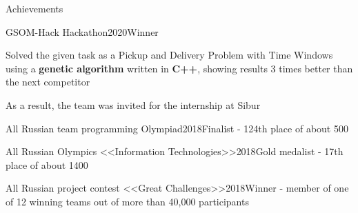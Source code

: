 \documentclass{./resume} %
\begin{document}

\begin{rSection}{Achievements}
    \begin{rSubsection}
        {GSOM-Hack Hackathon}{2020}{Winner}{}
        \item Solved the given task as a Pickup and Delivery Problem with Time Windows using a \textbf{genetic algorithm} written in \textbf{C++}, showing results 3 times better than the next competitor
        \item As a result, the team was invited for the internship at Sibur
    \end{rSubsection}
    \begin{rSubsubsection}
        {All Russian team programming Olympiad}{2018}{Finalist - 124th place of about 500}{}
    \end{rSubsubsection}
    \begin{rSubsubsection}
        {All Russian Olympics <<Information Technologies>>}{2018}{Gold medalist - 17th place of about 1400}{}
    \end{rSubsubsection}
    \begin{rSubsubsection}
        {All Russian project contest <<Great Challenges>>}{2018}{Winner - member of one of 12 winning teams out of more than 40,000 participants}{}
    \end{rSubsubsection}
\end{rSection}






\end{document}
